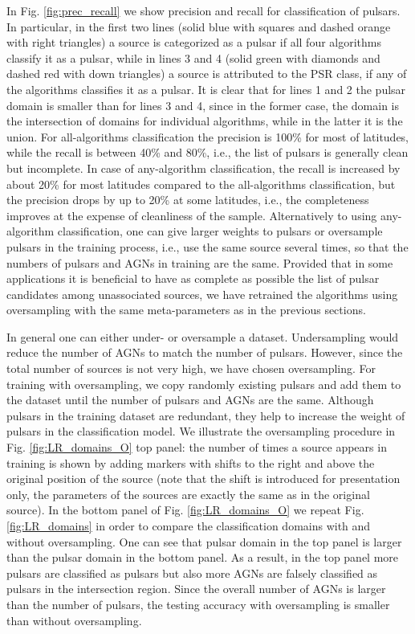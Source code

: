 In Fig. \ref{fig:prec_recall} we show precision and recall for classification of pulsars.
In particular, in the first two lines (solid blue with squares and dashed orange with right triangles) a source is categorized as a pulsar if all four algorithms classify it as a pulsar,
while in lines 3 and 4 (solid green with diamonds and dashed red with down triangles) a source is attributed to the PSR class, if any of the algorithms classifies it as a pulsar.
It is clear that for lines 1 and 2 the pulsar domain is smaller than for lines 3 and 4, since in the former case, the domain is the intersection of domains for individual algorithms, while in the latter it is the union.
For all-algorithms classification the precision is 100\% for most of latitudes, while the recall is between 40\% and 80\%, i.e., the list of pulsars is generally clean but incomplete.
In case of any-algorithm classification, the recall is increased by about 20\% for most latitudes compared to the all-algorithms classification, but the precision drops by up to 20\% at some latitudes, i.e., the completeness improves at the expense of cleanliness of the sample.
Alternatively to using any-algorithm classification, one can give larger weights to pulsars or oversample pulsars in the training process, i.e., use the same source several times, so that the numbers of pulsars and AGNs in training are the same.
Provided that in some applications it is beneficial to have as complete as possible the list of pulsar candidates among unassociated sources, we have retrained the algorithms using oversampling with the same meta-parameters as in the previous sections.

In general one can either under- or oversample a dataset. Undersampling would reduce the number of AGNs to match the number of pulsars. However, since the total number of sources is not very high, we have chosen oversampling. 
For training with oversampling, we copy randomly existing pulsars and add them to the dataset until the number of pulsars and AGNs are the same.
Although pulsars in the training dataset are redundant, they help to increase the weight of pulsars in the classification model.
We illustrate the oversampling procedure in Fig. \ref{fig:LR_domains_O} top panel:
the number of times a source appears in training is shown by adding markers with shifts to the right and above the original position of the source (note that the shift is introduced for presentation only, the parameters of the sources are exactly the same as in the original source).
In the bottom panel of Fig. \ref{fig:LR_domains_O} we repeat Fig.  \ref{fig:LR_domains} in order to compare the classification domains with and without oversampling.
One can see that pulsar domain in the top panel is larger than the pulsar domain in the bottom panel.
As a result, in the top panel more pulsars are classified as pulsars but also more AGNs are falsely classified as pulsars in the intersection region. 
Since the overall number of AGNs is larger than the number of pulsars, the testing accuracy with oversampling is smaller than without oversampling.

